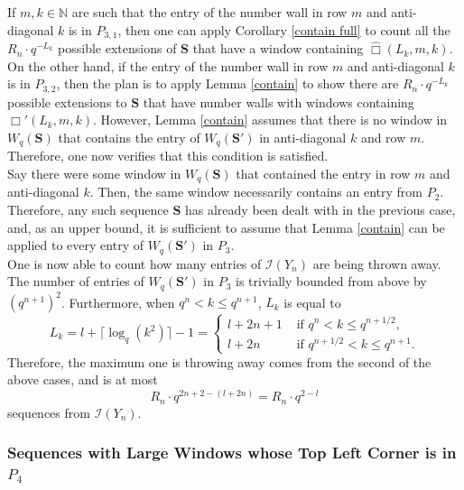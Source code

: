 \documentclass{article}
\theoremstyle{definition}
\newcommand{\N}{\mathbb{N}}
\numberwithin{equation}{subsection}
\begin{document}
\noindent If $m,k\in\N$ are such that the entry of the number wall in row $m$ and anti-diagonal $k$ is in $P_{3,1}$, then one can apply Corollary \ref{contain full} to count all the $R_n\cdot q^{-L_k}$ possible extensions of $\mathbf{S}$ that have a window containing $\widehat\Box(L_k,m,k)$.\\

\noindent On the other hand, if the entry of the number wall in row $m$ and anti-diagonal $k$ is in $P_{3,2}$, then the plan is to apply Lemma \ref{contain} to show there are $R_n\cdot q^{-L_k}$ possible extensions to $\mathbf{S}$ that have number walls with windows containing $\Box'(L_k,m,k)$. However, Lemma \ref{contain} assumes that there is no window in $W_q(\mathbf{S})$ that contains the entry of $W_q(\mathbf{S}')$ in anti-diagonal $k$ and row $m$. Therefore, one now verifies that this condition is satisfied.\\

\noindent Say there were some window in $W_q(\mathbf{S})$ that contained the entry in row $m$ and anti-diagonal $k$. Then, the same window necessarily contains an entry from $P_2$. Therefore, any such sequence $\mathbf{S}$ has already been dealt with in the previous case, and, as an upper bound, it is sufficient to assume that Lemma \ref{contain} can be applied to every entry of $W_q(\mathbf{S}')$ in $P_3$.\\

\noindent One is now able to count how many entries of $\mathcal{I}(Y_n)$ are being thrown away. The number of entries of $W_q(\mathbf{S}')$ in $P_3$ is trivially bounded from above by $(q^{n+1})^2$. Furthermore, when $q^n<k\le q^{n+1}$, $L_k$ is equal to $$L_k=l+\lceil\log_q(k^2)\rceil -1=\begin{cases}
    l+2n+1 &\text{ if } q^n<k\le q^{n+1/2},\\ l+2n &\text{ if }q^{n+1/2}<k\le q^{n+1}.
\end{cases}$$ Therefore, the maximum one is throwing away comes from the second of the above cases, and is at most \begin{equation}R_n\cdot q^{2n+2-(l+2n)}=R_n\cdot q^{2-l}\label{green}\end{equation} sequences from $\mathcal{I}(Y_n)$.

\subsubsection*{Sequences with Large Windows whose Top Left Corner is in $P_4$}
\end{document}
